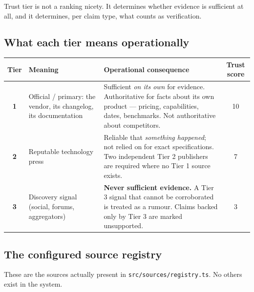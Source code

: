 \documentclass[11pt,a4paper]{article}
\newcommand{\file}[1]{\textcolor{aitkGray}{\texttt{\footnotesize\hyphenpenalty=0\exhyphenpenalty=0\relax #1}}}
\begin{document}
Trust tier is not a ranking nicety. It determines whether evidence is sufficient
at all, and it determines, per claim type, what counts as verification.

\subsection{What each tier means operationally}

\begin{center}
\small
\begin{tabularx}{\textwidth}{@{}c p{3.1cm} >{\RaggedRight}X c@{}}
\toprule
\textbf{Tier} & \textbf{Meaning} & \textbf{Operational consequence} & \textbf{Trust score} \\
\midrule
\textbf{1} & Official / primary: the vendor, its changelog, its documentation &
  Sufficient \emph{on its own} for evidence. Authoritative for facts about its own
  product --- pricing, capabilities, dates, benchmarks. Not authoritative about
  competitors. & 10 \\
\textbf{2} & Reputable technology press &
  Reliable that \emph{something happened}; not relied on for exact specifications.
  Two independent Tier 2 publishers are required where no Tier 1 source exists. & 7 \\
\textbf{3} & Discovery signal (social, forums, aggregators) &
  \textbf{Never sufficient evidence.} A Tier 3 signal that cannot be corroborated
  is treated as a rumour. Claims backed only by Tier 3 are marked unsupported. & 3 \\
\bottomrule
\end{tabularx}
\end{center}

\subsection{The configured source registry}

These are the sources actually present in \file{src/sources/registry.ts}. No
others exist in the system.
\end{document}
